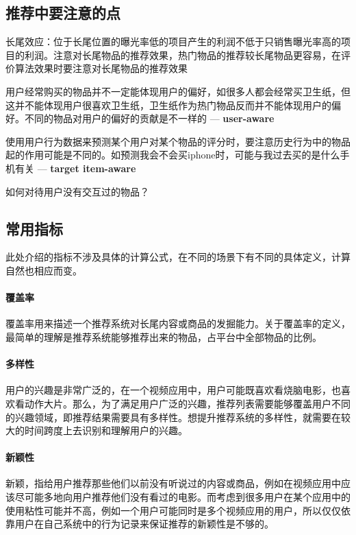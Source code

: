\subsection{推荐中要注意的点}
\begin{myitemize}
	\item 长尾效应：位于长尾位置的曝光率低的项目产生的利润不低于只销售曝光率高的项目的利润。注意对长尾物品的推荐效果，热门物品的推荐较长尾物品更容易，在评价算法效果时要注意对长尾物品的推荐效果
	\item 用户经常购买的物品并不一定能体现用户的偏好，如很多人都会经常买卫生纸，但这并不能体现用户很喜欢卫生纸，卫生纸作为热门物品反而并不能体现用户的偏好。不同的物品对用户的偏好的贡献是不一样的 --- \textbf{user-aware}
	\item 使用用户行为数据来预测某个用户对某个物品的评分时，要注意历史行为中的物品起的作用可能是不同的\cite{he2018nais}。如预测我会不会买iphone时，可能与我过去买的是什么手机有关 --- \textbf{target item-aware}
	\item 如何对待用户没有交互过的物品？
\end{myitemize}

\subsection{常用指标}
此处介绍的指标不涉及具体的计算公式，在不同的场景下有不同的具体定义，计算自然也相应而变。
\paragraph{覆盖率}覆盖率用来描述一个推荐系统对长尾内容或商品的发掘能力。关于覆盖率的定义，最简单的理解是推荐系统能够推荐出来的物品，占平台中全部物品的比例。

\paragraph{多样性}用户的兴趣是非常广泛的，在一个视频应用中，用户可能既喜欢看烧脑电影，也喜欢看动作大片。那么，为了满足用户广泛的兴趣，推荐列表需要能够覆盖用户不同的兴趣领域，即推荐结果需要具有多样性。想提升推荐系统的多样性，就需要在较大的时间跨度上去识别和理解用户的兴趣。

\paragraph{新颖性}新颖，指给用户推荐那些他们以前没有听说过的内容或商品，例如在视频应用中应该尽可能多地向用户推荐他们没有看过的电影。而考虑到很多用户在某个应用中的使用粘性可能并不高，例如一个用户可能同时是多个视频应用的用户，所以仅仅依靠用户在自己系统中的行为记录来保证推荐的新颖性是不够的。

